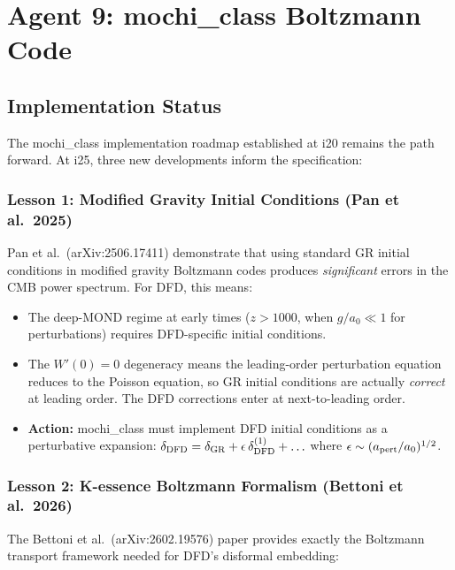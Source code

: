 \documentclass[11pt]{article}
\newcommand{\aM}{a_0}
\begin{document}
\section{Agent 9: mochi\_class Boltzmann Code}

\subsection{Implementation Status}

The mochi\_class implementation roadmap established at i20 remains the
path forward. At i25, three new developments inform the specification:

\subsubsection{Lesson 1: Modified Gravity Initial Conditions (Pan et al.\ 2025)}

Pan et al.\ (arXiv:2506.17411) demonstrate that using standard GR
initial conditions in modified gravity Boltzmann codes produces
\emph{significant} errors in the CMB power spectrum. For DFD, this
means:

\begin{itemize}
  \item The deep-MOND regime at early times ($z > 1000$, when
    $g/\aM \ll 1$ for perturbations) requires DFD-specific initial
    conditions.
  \item The $W'(0) = 0$ degeneracy means the leading-order perturbation
    equation reduces to the Poisson equation, so GR initial conditions
    are actually \emph{correct} at leading order. The DFD corrections
    enter at next-to-leading order.
  \item \textbf{Action:} mochi\_class must implement DFD initial conditions
    as a perturbative expansion: $\delta_{\rm DFD} = \delta_{\rm GR} +
    \epsilon\,\delta_{\rm DFD}^{(1)} + \ldots$ where $\epsilon \sim
    (a_{\rm pert}/\aM)^{1/2}$.
\end{itemize}

\subsubsection{Lesson 2: K-essence Boltzmann Formalism (Bettoni et al.\ 2026)}

The Bettoni et al.\ (arXiv:2602.19576) paper provides exactly the
Boltzmann transport framework needed for DFD's disformal embedding:
\end{document}
